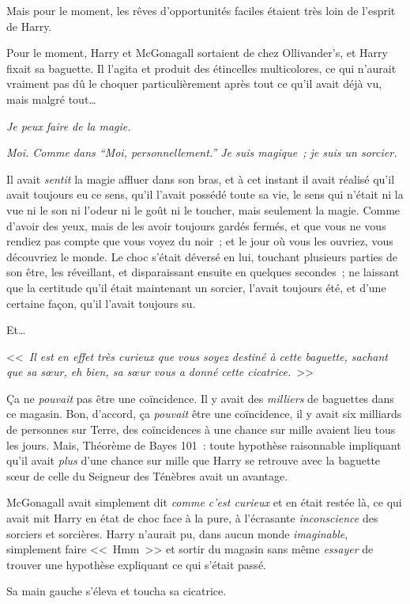 Mais pour le moment, les rêves d'opportunités faciles étaient très loin de l'esprit de Harry.

Pour le moment, Harry et McGonagall sortaient de chez Ollivander's, et Harry fixait sa baguette. Il l'agita et produit des étincelles multicolores, ce qui n'aurait vraiment pas dû le choquer particulièrement après tout ce qu'il avait déjà vu, mais malgré tout…

\emph{Je peux faire de la magie.}

\emph{Moi. Comme dans “Moi, personnellement.” Je suis magique~; je suis un sorcier.}

Il avait \emph{sentit} la magie affluer dans son bras, et à cet instant il avait réalisé qu'il avait toujours eu ce sens, qu'il l'avait possédé toute sa vie, le sens qui n'était ni la vue ni le son ni l'odeur ni le goût ni le toucher, mais seulement la magie. Comme d'avoir des yeux, mais de les avoir toujours gardés fermés, et que vous ne vous rendiez pas compte que vous voyez du noir~; et le jour où vous les ouvriez, vous découvriez le monde. Le choc s'était déversé en lui, touchant plusieurs parties de son être, les réveillant, et disparaissant ensuite en quelques secondes~; ne laissant que la certitude qu'il était maintenant un sorcier, l'avait toujours été, et d'une certaine façon, qu'il l'avait toujours su.

Et…

<<~\emph{Il est en effet très curieux que vous soyez destiné à cette baguette, sachant que sa sœur, eh bien, sa sœur vous a donné cette cicatrice.}~>>

Ça ne \emph{pouvait} pas être une coïncidence. Il y avait des \emph{milliers} de baguettes dans ce magasin. Bon, d'accord, ça \emph{pouvait} être une coïncidence, il y avait six milliards de personnes sur Terre, des coïncidences à une chance sur mille avaient lieu tous les jours. Mais, Théorème de Bayes 101~: toute hypothèse raisonnable impliquant qu'il avait \emph{plus} d'une chance sur mille que Harry se retrouve avec la baguette sœur de celle du Seigneur des Ténèbres avait un avantage.

McGonagall avait simplement dit \emph{comme c'est curieux} et en était restée là, ce qui avait mit Harry en état de choc face à la pure, à l'écrasante \emph{inconscience} des sorciers et sorcières. Harry n'aurait pu, dans aucun monde \emph{imaginable}, simplement faire <<~Hmm~>> et sortir du magasin sans même \emph{essayer} de trouver une hypothèse expliquant ce qui s'était passé.

Sa main gauche s'éleva et toucha sa cicatrice.

